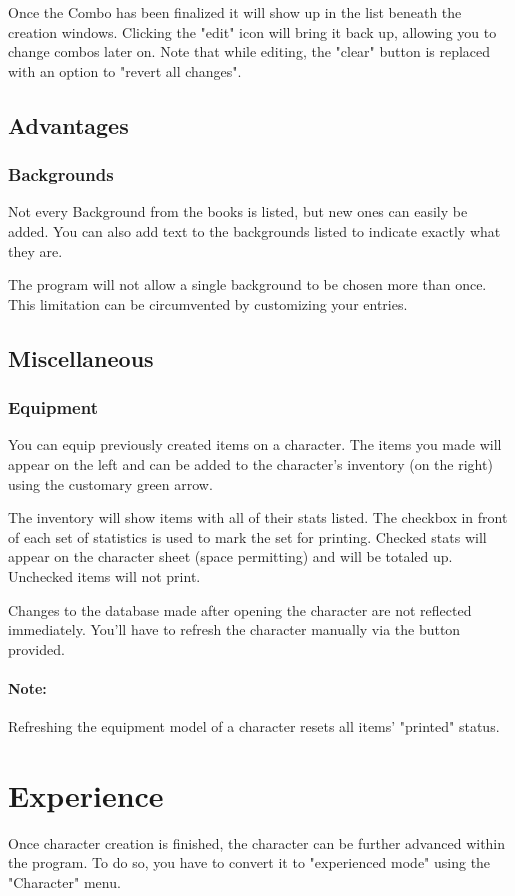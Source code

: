 Once the Combo has been finalized it will show up in the list beneath the creation windows. Clicking the  "edit" icon will bring it back up, allowing you to change combos later on. Note that while editing, the "clear" button is replaced with an option to "revert all changes".

\subsection{Advantages}
\subsubsection{Backgrounds}
Not every Background from the books is listed, but new ones can easily be added. You can also add text to the backgrounds listed to indicate exactly what they are. 

The program will not allow a single background to be chosen more than once. This limitation can be circumvented by customizing your entries.

\subsection{Miscellaneous}
\subsubsection{Equipment}
You can equip previously created items on a character. The items you made will appear on the left and can be added to the character's inventory (on the right) using the customary green arrow. 

The inventory will show items with all of their stats listed. The checkbox in front of each set of statistics is used to mark the set for printing. Checked stats will appear on the character sheet (space permitting) and will be totaled up.  Unchecked items will not print.

Changes to the database made after opening the character are not reflected immediately. You'll have to refresh the character manually via the button provided.

\paragraph{Note:} Refreshing the equipment model of a character resets all items' "printed" status.

\section{Experience}
Once character creation is finished, the character can be further advanced within the program. To do so, you have to convert it to "experienced mode" using the "Character" menu.
 
